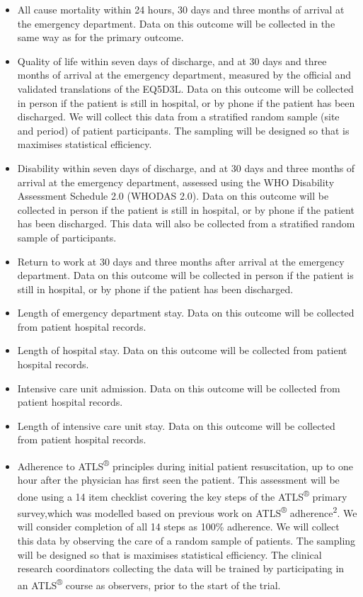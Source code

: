 \documentclass[
]{scrartcl}
\providecommand{\tightlist}{%
  \setlength{\itemsep}{0pt}\setlength{\parskip}{0pt}}\usepackage{longtable,booktabs,array}
\begin{document}
\begin{itemize}
\tightlist
\item
  All cause mortality within 24 hours, 30 days and three months of
  arrival at the emergency department. Data on this outcome will be
  collected in the same way as for the primary outcome.
\item
  Quality of life within seven days of discharge, and at 30 days and
  three months of arrival at the emergency department, measured by the
  official and validated translations of the EQ5D3L. Data on this
  outcome will be collected in person if the patient is still in
  hospital, or by phone if the patient has been discharged. We will
  collect this data from a stratified random sample (site and period) of
  patient participants. The sampling will be designed so that is
  maximises statistical efficiency.
\item
  Disability within seven days of discharge, and at 30 days and three
  months of arrival at the emergency department, assessed using the WHO
  Disability Assessment Schedule 2.0 (WHODAS 2.0). Data on this outcome
  will be collected in person if the patient is still in hospital, or by
  phone if the patient has been discharged. This data will also be
  collected from a stratified random sample of participants.
\item
  Return to work at 30 days and three months after arrival at the
  emergency department. Data on this outcome will be collected in person
  if the patient is still in hospital, or by phone if the patient has
  been discharged.
\item
  Length of emergency department stay. Data on this outcome will be
  collected from patient hospital records.
\item
  Length of hospital stay. Data on this outcome will be collected from
  patient hospital records.
\item
  Intensive care unit admission. Data on this outcome will be collected
  from patient hospital records.
\item
  Length of intensive care unit stay. Data on this outcome will be
  collected from patient hospital records.
\item
  Adherence to ATLS\textsuperscript{®} principles during initial patient
  resuscitation, up to one hour after the physician has first seen the
  patient. This assessment will be done using a 14 item checklist
  covering the key steps of the ATLS\textsuperscript{®} primary
  survey,which was modelled based on previous work on
  ATLS\textsuperscript{®} adherence\textsuperscript{2}. We will consider
  completion of all 14 steps as 100\% adherence. We will collect this
  data by observing the care of a random sample of patients. The
  sampling will be designed so that is maximises statistical efficiency.
  The clinical research coordinators collecting the data will be trained
  by participating in an ATLS\textsuperscript{®} course as observers,
  prior to the start of the trial.
\end{itemize}
\end{document}
